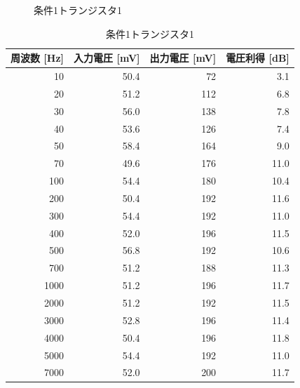 \documentclass[a4paper,11pt,xelatex,ja=standard]{bxjsarticle}
\begin{document}
\begin{figure}[H]
            \caption{条件1トランジスタ1}
        \end{figure}

        \begin{table}[H]
            \centering
            \caption{条件1トランジスタ1}
            \begin{tabular}{rrrr}
                \hline
                周波数 [Hz] & 入力電圧 [mV] & 出力電圧 [mV] & 電圧利得 [dB] \\
                \hline\hline
                10 & 50.4 & 72 & 3.1 \\
                20 & 51.2 & 112 & 6.8 \\
                30 & 56.0 & 138 & 7.8 \\
                40 & 53.6 & 126 & 7.4 \\
                50 & 58.4 & 164 & 9.0 \\
                70 & 49.6 & 176 & 11.0 \\
                100 & 54.4 & 180 & 10.4 \\
                200 & 50.4 & 192 & 11.6 \\
                300 & 54.4 & 192 & 11.0 \\
                400 & 52.0 & 196 & 11.5 \\
                500 & 56.8 & 192 & 10.6 \\
                700 & 51.2 & 188 & 11.3 \\
                1000 & 51.2 & 196 & 11.7 \\
                2000 & 51.2 & 192 & 11.5 \\
                3000 & 52.8 & 196 & 11.4 \\
                4000 & 50.4 & 196 & 11.8 \\
                5000 & 54.4 & 192 & 11.0 \\
                7000 & 52.0 & 200 & 11.7 \\

\end{tabular}
\end{table}
\end{document}
